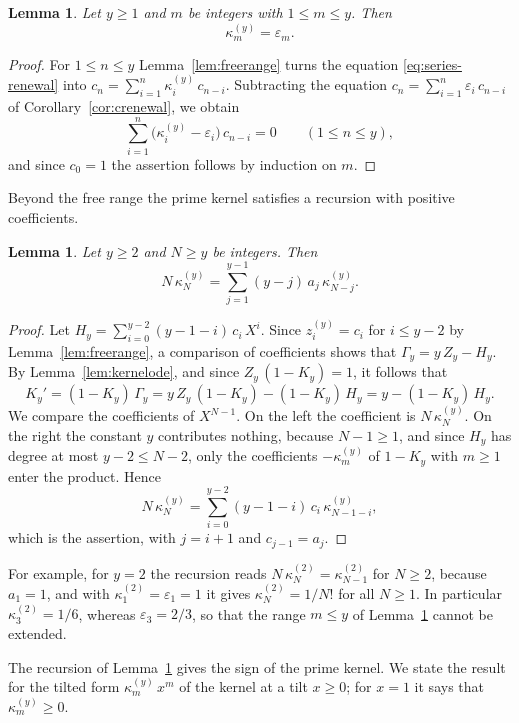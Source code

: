 \documentclass{amsart}
\newtheorem{lemma}[theorem]{Lemma}
\theoremstyle{definition}
\theoremstyle{remark}
\numberwithin{equation}{section}
\begin{document}
\begin{lemma}\label{lem:kernelfree}
Let $y\ge 1$ and $m$ be integers with $1\le m\le y$. Then
\[
\kappa^{(y)}_m=\varepsilon_m .
\]
\end{lemma}

\begin{proof}
For $1\le n\le y$ Lemma~\ref{lem:freerange} turns the equation \eqref{eq:series-renewal} into $c_n=\sum_{i=1}^{n}\kappa^{(y)}_i\,c_{n-i}$. Subtracting the equation $c_n=\sum_{i=1}^{n}\varepsilon_i\,c_{n-i}$ of Corollary~\ref{cor:crenewal}, we obtain
\[
\sum_{i=1}^{n}\bigl(\kappa^{(y)}_i-\varepsilon_i\bigr)\,c_{n-i}=0\qquad(1\le n\le y),
\]
and since $c_0=1$ the assertion follows by induction on $m$.
\end{proof}

Beyond the free range the prime kernel satisfies a recursion with positive coefficients.

\begin{lemma}\label{lem:kernelrecursion}
Let $y\ge 2$ and $N\ge y$ be integers. Then
\[
N\,\kappa^{(y)}_N=\sum_{j=1}^{y-1}(y-j)\,a_j\,\kappa^{(y)}_{N-j} .
\]
\end{lemma}

\begin{proof}
Let $H_y=\sum_{i=0}^{y-2}(y-1-i)\,c_i\,X^i$. Since $z^{(y)}_i=c_i$ for $i\le y-2$ by Lemma~\ref{lem:freerange}, a comparison of coefficients shows that $\Gamma_y=y\,Z_y-H_y$. By Lemma~\ref{lem:kernelode}, and since $Z_y\,(1-K_y)=1$, it follows that
\[
K_y'=(1-K_y)\,\Gamma_y=y\,Z_y\,(1-K_y)-(1-K_y)\,H_y=y-(1-K_y)\,H_y .
\]
We compare the coefficients of $X^{N-1}$. On the left the coefficient is $N\,\kappa^{(y)}_N$. On the right the constant $y$ contributes nothing, because $N-1\ge 1$, and since $H_y$ has degree at most $y-2\le N-2$, only the coefficients $-\kappa^{(y)}_m$ of $1-K_y$ with $m\ge 1$ enter the product. Hence
\[
N\,\kappa^{(y)}_N=\sum_{i=0}^{y-2}(y-1-i)\,c_i\,\kappa^{(y)}_{N-1-i} ,
\]
which is the assertion, with $j=i+1$ and $c_{j-1}=a_j$.
\end{proof}

For example, for $y=2$ the recursion reads $N\,\kappa^{(2)}_N=\kappa^{(2)}_{N-1}$ for $N\ge 2$, because $a_1=1$, and with $\kappa^{(2)}_1=\varepsilon_1=1$ it gives $\kappa^{(2)}_N=1/N!$ for all $N\ge 1$. In particular $\kappa^{(2)}_3=1/6$, whereas $\varepsilon_3=2/3$, so that the range $m\le y$ of Lemma~\ref{lem:kernelfree} cannot be extended.

The recursion of Lemma~\ref{lem:kernelrecursion} gives the sign of the prime kernel. We state the result for the tilted form $\kappa^{(y)}_m\,x^m$ of the kernel at a tilt $x\ge 0$; for $x=1$ it says that $\kappa^{(y)}_m\ge 0$.
\end{document}
